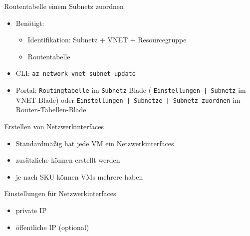 \begin{flashcard}[Definition]{Routentabelle einem Subnetz zuordnen}
    \begin{itemize}
        \item Benötigt:
            \begin{itemize}
                \item Identifikation: Subnetz + VNET + Resourcegruppe
                \item Routentabelle
            \end{itemize}
        \item CLI: \texttt{az network vnet subnet update}
        \item Portal: \texttt{Routingtabelle} im \texttt{Subnetz}-Blade ( \texttt{Einstellungen | Subnetz} im VNET-Blade) \newline
            oder \newline
            \texttt{Einstellungen | Subnetze | Subnetz zuordnen} im Routen-Tabellen-Blade
    \end{itemize}
\end{flashcard}


\begin{flashcard}[Definition]{Erstellen von Netzwerkinterfaces}
    \begin{itemize}
        \item Standardmäßig hat jede VM ein Netzwerkinterfaces
        \item zusätzliche können erstellt werden
        \item je nach SKU können VMs mehrere haben
    \end{itemize}
\end{flashcard}

\begin{flashcard}[Definition]{Einstellungen für Netzwerkinterfaces}
    \begin{itemize}
        \item private IP
        \item öffentliche IP (optional)
    \end{itemize}
\end{flashcard}

